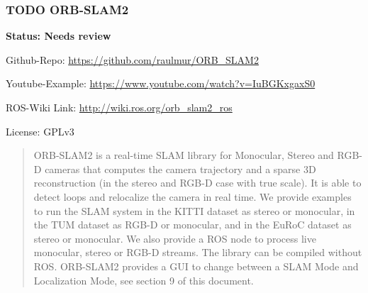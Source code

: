 \documentclass[unrestricted]{meetingnotesminutes}
\begin{document}
\subsubsection{{\bfseries\sffamily TODO} ORB-SLAM2}
\label{sec:org6f38a63}

\textbf{Status: Needs review}

Github-Repo: \url{https://github.com/raulmur/ORB\_SLAM2}

Youtube-Example: \url{https://www.youtube.com/watch?v=IuBGKxgaxS0}

ROS-Wiki Link: \url{http://wiki.ros.org/orb\_slam2\_ros}

License: GPLv3

\begin{quote}
ORB-SLAM2 is a real-time SLAM library for Monocular, Stereo and RGB-D cameras that computes the camera trajectory and a sparse 3D reconstruction (in the stereo and RGB-D case with true scale). It is able to detect loops and relocalize the camera in real time. We provide examples to run the SLAM system in the KITTI dataset as stereo or monocular, in the TUM dataset as RGB-D or monocular, and in the EuRoC dataset as stereo or monocular. We also provide a ROS node to process live monocular, stereo or RGB-D streams. The library can be compiled without ROS. ORB-SLAM2 provides a GUI to change between a SLAM Mode and Localization Mode, see section 9 of this document.
\end{quote}
\end{document}
